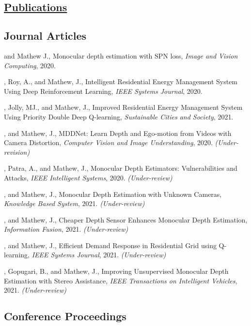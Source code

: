 \documentclass[mm]{simple_style}
\begin{document}
\begin{resume}
\section{\href{https://alwynm.github.io/pub}{Publications}}

\vspace{-3.5ex}
\subsection{Journal Articles}
\vspace{-2ex}

 and Mathew J., Monocular depth estimation with SPN loss, \textit{Image and Vision Computing}, 2020.

, Roy, A.,  and Mathew, J., Intelligent Residential Energy Management System Using Deep Reinforcement Learning, \textit{IEEE Systems Journal}, 2020.

, Jolly, MJ., and Mathew, J., Improved Residential Energy Management System Using Priority Double Deep Q-learning, \textit{Sustainable Cities and Society}, 2021.

, and Mathew, J., MDDNet: Learn Depth and Ego-motion from Videos with Camera Distortion, \textit{Computer Vision and Image Understanding}, 2020. \textit{(Under-revision)}

, Patra, A., and Mathew, J., Monocular Depth Estimators: Vulnerabilities and Attacks, \textit{IEEE Intelligent Systems}, 2020. \textit{(Under-review)}

, and Mathew, J., Monocular Depth Estimation with Unknown Cameras, \textit{Knowledge Based System}, 2021. \textit{(Under-review)}

, and Mathew, J., Cheaper Depth Sensor Enhances
Monocular Depth Estimation, \textit{Information Fusion}, 2021. \textit{(Under-review)}

, and Mathew, J., Efficient Demand Response in Residential Grid using Q-learning, \textit{IEEE Systems Journal}, 2021. \textit{(Under-review)}

, Gopugari, B., and Mathew, J., Improving Unsupervised Monocular Depth
Estimation with Stereo Assistance, \textit{IEEE Transactions on Intelligent Vehicles}, 2021. \textit{(Under-review)}
\halfsectionline
\vspace{-12mm}
\subsection{Conference Proceedings}
\vspace{-2ex}


\end{resume}
\end{document}
